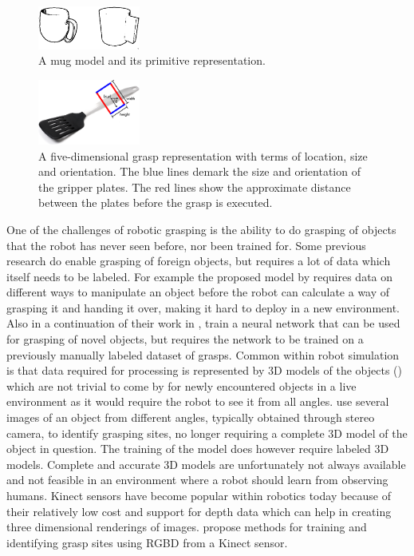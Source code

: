 \begin{figure}
	\centering
	\includegraphics[width=0.3\textwidth]{img/related-work/shape-primitives.png}
	\caption{A mug model and its primitive representation.}
\end{figure}

\begin{figure}
	\centering
	\includegraphics[width=0.3\textwidth]{img/related-work/grasp-representation.png}
	\caption{A five-dimensional grasp representation with terms of location, size and orientation. The blue lines demark the size and orientation of the gripper plates. The red lines show the approximate distance between the plates before the grasp is executed. \label{fig:grasp-representation}}
\end{figure}

One of the challenges of robotic grasping is the ability to do grasping of objects that the robot has never seen before, nor been trained for. Some previous research do enable grasping of foreign objects, but requires a lot of data which itself needs to be labeled. For example the proposed model by \textcite{Chan2014} requires data on different ways to manipulate an object before the robot can calculate a way of grasping it and handing it over, making it hard to deploy in a new environment. Also \textcite{Huebner2008a} in a continuation of their work in \parencite{Huebner2008}, train a neural network that can be used for grasping of novel objects, but requires the network to be trained on a previously manually labeled dataset of grasps. Common within robot simulation is that data required for processing is represented by 3D models of the objects (\parencite{Miller2003}) which are not trivial to come by for newly encountered objects in a live environment as it would require the robot to see it from all angles. \textcite{Saxena2008} use several images of an object from different angles, typically obtained through stereo camera, to identify grasping sites, no longer requiring a complete 3D model of the object in question. The training of the model does however require labeled 3D models. Complete and accurate 3D models are unfortunately not always available and not feasible in an environment where a robot should learn from observing humans. Kinect sensors have become popular within robotics today because of their relatively low cost and support for depth data which can help in creating three dimensional renderings of images. \parencite{Lenz2015} \parencite{Redmon2014} \parencite{Jiang2011} propose methods for training and identifying grasp sites using RGBD from a Kinect sensor.

